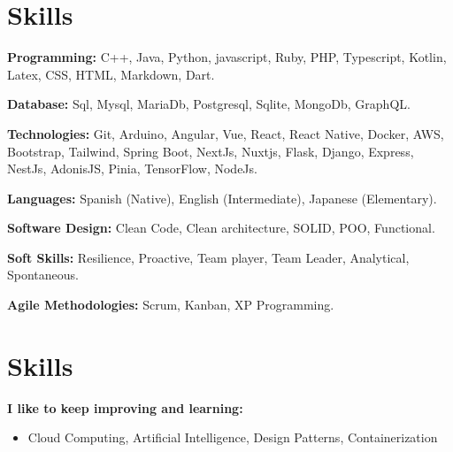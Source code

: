 \documentclass[letterpaper,11pt]{article}
\newcommand{\resumeItem}[1]{
  \item\small{
    {#1 \vspace{-2pt}}
  }
}
\newcommand{\resumeSubHeadingListStart}{\begin{itemize}[leftmargin=0.15in, label={}]}
\newcommand{\resumeSubHeadingListEnd}{\end{itemize}}
\newcommand{\resumeItemListStart}{\begin{itemize}}
\newcommand{\resumeItemListEnd}{\end{itemize}\vspace{-5pt}}
\begin{document}
\section{Skills}
\vspace{2pt}
\resumeSubHeadingListStart
\small{\item{
              \textbf{Programming:}{ C++, Java, Python, javascript, Ruby, PHP, Typescript, Kotlin, Latex, CSS, HTML, Markdown, Dart.} \\ \vspace{3pt}

              \textbf{Database:}{ Sql, Mysql, MariaDb, Postgresql, Sqlite, MongoDb, GraphQL.} \\ \vspace{3pt}

              \textbf{Technologies:}{ Git, Arduino, Angular, Vue, React, React Native, Docker, AWS, Bootstrap, Tailwind, Spring Boot, NextJs, Nuxtjs, Flask, Django, Express, NestJs, AdonisJS, Pinia, TensorFlow, NodeJs.} \\ \vspace{3pt}

              \textbf{Languages:}{ Spanish (Native), English (Intermediate), Japanese (Elementary).}

              \textbf{Software Design:}{ Clean Code, Clean architecture, SOLID, POO, Functional.}

              \textbf{Soft Skills:}{ Resilience, Proactive, Team player, Team Leader, Analytical, Spontaneous.}

              \textbf{Agile Methodologies:}{ Scrum, Kanban, XP Programming.}

        }}
\resumeSubHeadingListEnd

\section{Skills}
\vspace{2pt}
\resumeSubHeadingListStart
\small{\item{
              \textbf{I like to keep improving and learning:}} \\ \vspace{3pt}
}
\resumeItemListStart
\resumeItem{Cloud Computing, Artificial Intelligence, Design Patterns, Containerization}
\resumeItemListEnd
\resumeSubHeadingListEnd
\end{document}
